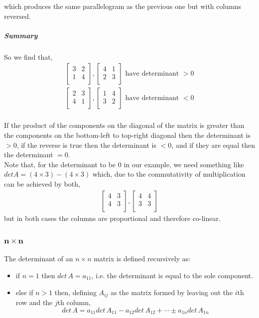 \documentclass[MathsNotesBase.tex]{subfiles}
\begin{document}
{		which produces the same parallelogram as the previous one but with columns reversed.
		\subparagraph{Summary} So we find that,
		\begin{align*}
		\begin{bmatrix}    
		3  &   2 \\
		1  &   4 \\		
		\end{bmatrix},
		\begin{bmatrix}    
		4  &   1 \\
		2  &   3 \\		
		\end{bmatrix}
		\text{ have determinant } > 0\\[10pt]
		\begin{bmatrix}    
		2  &   3 \\
		4  &   1 \\		
		\end{bmatrix},
		\begin{bmatrix}    
		1  &   4 \\
		3  &   2 \\		
		\end{bmatrix}
		\text{ have determinant } < 0\\[10pt]
		\end{align*}
		
		If the product of the components on the diagonal of the matrix is greater than the components on the bottom-left to top-right diagonal then the determinant is $> 0$, if the reverse is true then the determinant is $< 0$, and if they are equal then the determinant $= 0$.\\
		Note that, for the determinant to be $0$ in our example, we need something like $det A = (4 \times 3) - (4 \times 3)$ which, due to the commutativity of multiplication can be achieved by both,
		\begin{align*}
		\begin{bmatrix}    
		4  &   3 \\
		4  &   3 \\		
		\end{bmatrix},
		\begin{bmatrix}    
		4  &   4 \\
		3  &   3 \\		
		\end{bmatrix}
		\end{align*}
		but in both cases the columns are proportional and therefore co-linear.
		
		\subsubsection{$\bm{n \times n}$}
		The determinant of an $n \times n$ matrix is defined recursively as:
		\begin{itemize}
		\item{if $n = 1$ then $det\, A = a_{11}$, i.e. the determinant is equal to the sole component.}
		\item{else if $n > 1$ then, defining $A_{ij}$ as the matrix formed by leaving out the $i$th row and the $j$th column,
				\[ det\, A = a_{11}det\, A_{11} - a_{12}det\, A_{12} + \cdots \pm a_{1n}det\, A_{1n} \]}
		\end{itemize}
		
}
\end{document}
